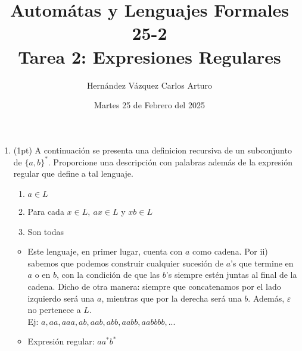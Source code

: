 \documentclass{article}
\title{Autom\'atas y Lenguajes Formales 25-2 \\ Tarea 2: Expresiones Regulares}
\author{Hernández Vázquez Carlos Arturo }
\date{Martes 25 de Febrero del 2025}
\begin{document}
\maketitle

\begin{enumerate}
    \item (1pt) A continuación se presenta una definicion recursiva de un subconjunto de $\{a, b\}^*$. Proporcione una descripción con palabras adem\'as de la expresión regular que define a tal lenguaje.
    \begin{enumerate}[label=\roman*.]
        \renewcommand{\labelenumi}{\Roman{enumi}}
        \item $a \in L$
        \item Para cada $x \in L,~ ax \in L$ y $xb \in L$
        \item Son todas
    \end{enumerate}
    \begin{itemize}[label=-]
        \item Este lenguaje, en primer lugar, cuenta con $a$ como cadena. Por ii) sabemos que podemos construir cualquier sucesión de $a$'s que termine en $a$ o en $b$, con la condición de que las $b$'s siempre estén juntas al final de la cadena. Dicho de otra manera: siempre que concatenamos por el lado izquierdo será una $a$, mientras que por la derecha será una $b$.
        Adem\'as, $\varepsilon$ no pertenece a $L$. \\ Ej: $a, aa, aaa, ab, aab ,abb, aabb, aabbbb, ...$
        \item Expresi\'on regular: $aa^*b^*$
    \end{itemize}


\end{enumerate}
\end{document}
